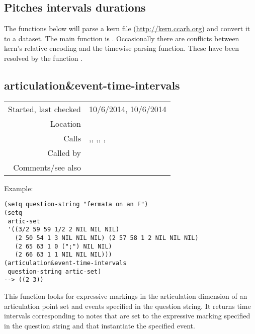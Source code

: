 \subsection{Pitches intervals durations}\label{sec:pitches-intervals-durations}

The functions below will parse a kern file
(\href{http://kern.ccarh.org}{http://kern.ccarh.org}) and convert it to a dataset.
The main function is . Occasionally
there are conflicts between kern's relative encoding
and the timewise parsing function. These have been
resolved by the function .


\subsection*{articulation\&event-time-intervals}\label{fun:articulation-and-event-time-intervals}

\vspace{0.3cm}
\begin{tabular}{r|p{8cm}}
Started, last checked & 10/6/2014, 10/6/2014 \\
Location & \nameref{sec:pitches-intervals-durations} \\
Calls & \nameref{fun:duration-time-intervals},\newline \nameref{fun:duration-n-pitch-class-time-intervals}, \nameref{fun:intersection-multidimensional},\newline \nameref{fun:pitch-class-time-intervals}, \nameref{fun:replace-all},\newline \nameref{fun:string-separated-string2list} \\
Called by & \nameref{fun:Stravinsqi-Jun2014} \\
Comments/see also & \nameref{fun:word-and-event-time-intervals}
\end{tabular}

\vspace{0.5cm}
\noindent Example:
\begin{verbatim}
(setq question-string "fermata on an F")
(setq
 artic-set
 '((3/2 59 59 1/2 2 NIL NIL NIL)
   (2 50 54 1 3 NIL NIL NIL) (2 57 58 1 2 NIL NIL NIL)
   (2 65 63 1 0 (";") NIL NIL)
   (2 66 63 1 1 NIL NIL NIL)))
(articulation&event-time-intervals
 question-string artic-set)
--> ((2 3))
\end{verbatim}

\noindent This function looks for expressive markings
in the articulation dimension of an articulation point
set and events specified in the question string. It
returns time intervals corresponding to notes that are
set to the expressive marking specified in the question
string and that instantiate the specified event.


